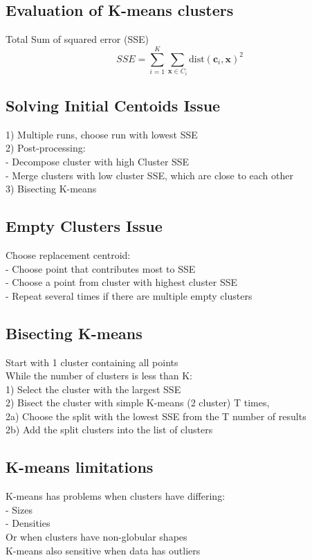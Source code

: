 \subsection*{Evaluation of K-means clusters}
Total Sum of squared error (SSE)\\
\[SSE = \sum^K_{i=1}\sum_{\mathbf{x}\in C_i} \text{dist}(\mathbf{c}_i, \mathbf{x})^2\]

\subsection*{Solving Initial Centoids Issue}
1) Multiple runs, choose run with lowest SSE\\
2) Post-processing:\\
- Decompose cluster with high Cluster SSE\\
- Merge clusters with low cluster SSE, which are close to each other\\
3) Bisecting K-means

\subsection*{Empty Clusters Issue}
Choose replacement centroid:\\
- Choose point that contributes most to SSE\\
- Choose a point from cluster with highest cluster SSE\\
- Repeat several times if there are multiple empty clusters\\

\subsection*{Bisecting K-means}
Start with 1 cluster containing all points\\
While the number of clusters is less than K:\\
1) Select the cluster with the largest SSE\\
2) Bisect the cluster with simple K-means (2 cluster) T times,\\
2a) Choose the split with the lowest SSE from the T number of results\\
2b) Add the split clusters into the list of clusters\\

\subsection*{K-means limitations}
K-means has problems when clusters have differing:\\
- Sizes\\
- Densities\\
Or when clusters have non-globular shapes\\
K-means also sensitive when data has outliers

